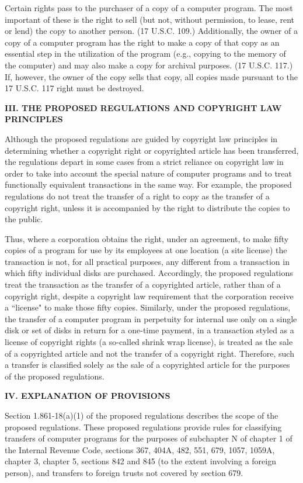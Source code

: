 \begin{select}
Certain rights pass to the purchaser of a copy of a computer program. The most important of these is the right to sell (but not, without permission, to lease, rent or lend) the copy to another person. (17 U.S.C. 109.) Additionally, the owner of a copy of a computer program has the right to make a copy of that copy as an essential step in the utilization of the program (e.g., copying to the memory of the computer) and may also make a copy for archival purposes. (17 U.S.C. 117.) If, however, the owner of the copy sells that copy, all copies made pursuant to the 17 U.S.C. 117 right must be destroyed.

\begin{center} \textbf{III. THE PROPOSED REGULATIONS AND COPYRIGHT LAW PRINCIPLES}
\end{center}

Although the proposed regulations are guided by copyright law principles in determining whether a copyright right or copyrighted article has been transferred, the regulations depart in some cases from a strict reliance on copyright law in order to take into account the special nature of computer programs and to treat functionally equivalent transactions in the same way. For example, the proposed regulations do not treat the transfer of a right to copy as the transfer of a copyright right, unless it is accompanied by the right to distribute the copies to the public.

Thus, where a corporation obtains the right, under an agreement, to make fifty copies of a program for use by its employees at one location (a site license) the transaction is not, for all practical purposes, any different from a transaction in which fifty individual disks are purchased. Accordingly, the proposed regulations treat the transaction as the transfer of a copyrighted article, rather than of a copyright right, despite a copyright law requirement that the corporation receive a ``license" to make those fifty copies. Similarly, under the proposed regulations, the transfer of a computer program in perpetuity for internal use only on a single disk or set of disks in return for a one-time payment, in a transaction styled as a license of copyright rights (a so-called shrink wrap license), is treated as the sale of a copyrighted article and not the transfer of a copyright right. Therefore, such a transfer is classified solely as the sale of a copyrighted article for the purposes of the proposed regulations.

\begin{center} \textbf{IV. EXPLANATION OF PROVISIONS}
\end{center}
Section 1.861-18(a)(1) of the proposed regulations describes the scope of the proposed regulations. These proposed regulations provide rules for classifying transfers of computer programs for the purposes of subchapter N of chapter 1 of the Internal Revenue Code, sections 367, 404A, 482, 551, 679, 1057, 1059A, chapter 3, chapter 5, sections 842 and 845 (to the extent involving a foreign person), and transfers to foreign trusts not covered by section 679.


\end{select}
